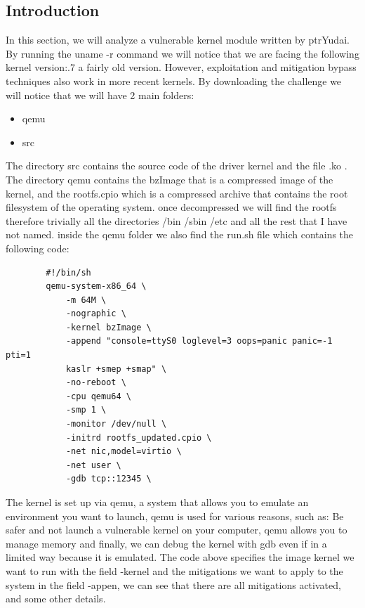     \subsection{Introduction}
    In this section, we will analyze a vulnerable kernel module written by ptrYudai\cite{PWNYABLE}.\newline
    By running the uname -r command we will notice that we are facing the following kernel version:.7 a fairly old version.\newline
    However, exploitation and mitigation bypass techniques also work in more recent kernels.\newline
    By downloading the challenge we will notice that we will have 2 main folders:\newline
    \begin{itemize}
        \item qemu 
        \item src 
    \end{itemize}
    The directory src contains the source code of the driver kernel and the file .ko .\newline
    The directory qemu contains the bzImage that is a compressed image of the kernel, and the rootfs.cpio which is a compressed archive that contains the root filesystem of the operating system.\newline
    once decompressed we will find the rootfs therefore trivially all the directories /bin /sbin /etc and all the rest that I have not named. \newline
    inside the qemu folder we also find the run.sh file which contains the following code:\newline
    \clearpage
    \begin{verbatim}
        #!/bin/sh
        qemu-system-x86_64 \
            -m 64M \
            -nographic \
            -kernel bzImage \
            -append "console=ttyS0 loglevel=3 oops=panic panic=-1 pti=1
            kaslr +smep +smap" \
            -no-reboot \
            -cpu qemu64 \
            -smp 1 \
            -monitor /dev/null \
            -initrd rootfs_updated.cpio \
            -net nic,model=virtio \
            -net user \
            -gdb tcp::12345 \
    \end{verbatim}
    The kernel is set up via qemu, a system that allows you to emulate an environment you want to launch, qemu is used for various reasons, such as:\newline
    Be safer and not launch a vulnerable kernel on your computer, qemu allows you to manage memory and finally, we can debug the kernel with gdb even if in a limited way because it is emulated.\newline
    The code above specifies the image kernel we want to run with the field -kernel and the mitigations we want to apply to the system in the field -appen, we can see that there are all mitigations activated, and some other details.\newline

